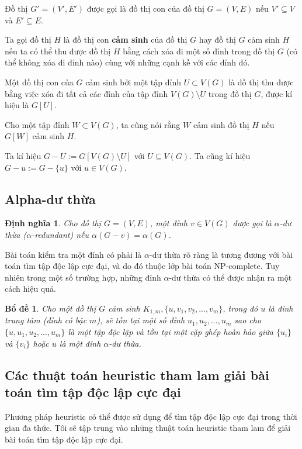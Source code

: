 \documentclass[14pt, oneside, a4paper, openany]{scrartcl}
\newtheorem{lemma}[theorem]{Bổ đề}
\newtheorem{definition}{Định nghĩa}[section]
\begin{document}
Đồ thị $G'=(V',E')$ được gọi là đồ thị con  của đồ thị $G=(V,E)$ nếu $V' \subseteq V$ và $E' \subseteq E$.

Ta gọi đồ thị $H$ là đồ thị con \textbf{cảm sinh}  của đồ thị $G$ hay đồ thị $G$ cảm sinh $H$ nếu ta có thể thu được đồ thị $H$ bằng cách xóa đi một số đỉnh trong đồ thị $G$ (có thể không xóa đi đỉnh nào) cùng với những cạnh kề với các đỉnh đó.

Một đồ thị con của $G$ cảm sinh bởi một tập đỉnh $U \subset V(G)$ là đồ thị thu được bằng việc xóa đi tất cả các đỉnh của tập đỉnh $V(G) \setminus U$ trong đồ thị $G$, được kí hiệu là $G[U]$.

Cho một tập đỉnh $W \subset V(G)$, ta cũng nói rằng $W$ cảm sinh đồ thị $H$ nếu $G[W]$ cảm sinh $H$.

Ta kí hiệu $G - U := G[V(G) \setminus U]$ với $U \subseteq V(G)$.
Ta cũng kí hiệu $G - u := G - \{u\}$ với $u \in V(G)$.

\subsection{Alpha-dư thừa}
\begin{definition}
	\cite{alpharedundan} Cho đồ thị $G = (V,E)$, một đỉnh $v \in V(G)$ được gọi là $\alpha$-dư thừa ($\alpha$-redundant)  nếu $\alpha(G-v) = \alpha(G)$.
\end{definition}

Bài toán kiểm tra một đỉnh có phải là $\alpha$-dư thừa rõ ràng là tương đương với bài toán tìm tập độc lập cực đại, và do đó thuộc lớp bài toán NP-complete. Tuy nhiên trong một số trường hợp, những đỉnh $\alpha$-dư thừa có thể được nhận ra một cách hiệu quả.

\begin{lemma}
	\cite{alpharedudant2} Cho một đồ thị $G$ cảm sinh $K_{1,m}, \{u,v_1,v_2,...,v_m\}$, trong đó $u$ là đỉnh trung tâm (đỉnh có bậc $m$), sẽ tồn tại một số đỉnh $u_1,u_2,...,u_m$ sao cho $\{u,u_1,u_2,...,u_m\}$ là một tập độc lập và tồn tại một cặp ghép hoàn hảo giữa $\{u_i\}$ và $\{v_i\}$ hoặc $u$ là một đỉnh $\alpha$-dư thừa.
\end{lemma}

\subsection{Các thuật toán heuristic tham lam giải bài toán tìm tập độc lập cực đại}
Phương pháp heuristic có thể được sử dụng để tìm tập độc lập cực đại trong thời gian đa thức. Tôi sẽ tập trung vào những thuật toán heuristic tham lam để giải bài toán tìm tập độc lập cực đại.
\end{document}
